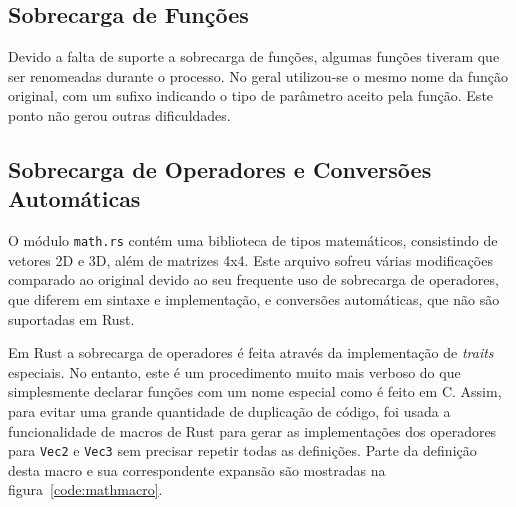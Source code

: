 \documentclass[tg]{mdtufsm}
\def\Cpp{{C\nolinebreak[4]\raisebox{.20ex}{\small\bf++}}}
\begin{document}
\subsection{Sobrecarga de Funções}

Devido a falta de suporte a sobrecarga de funções, algumas funções tiveram que ser renomeadas durante o processo. No geral utilizou-se o mesmo nome da função original, com um sufixo indicando o tipo de parâmetro aceito pela função. Este ponto não gerou outras dificuldades.

\subsection{Sobrecarga de Operadores e Conversões Automáticas}

O módulo \texttt{math.rs} contém uma biblioteca de tipos matemáticos, consistindo de vetores 2D e 3D, além de matrizes 4x4. Este arquivo sofreu várias modificações comparado ao original devido ao seu frequente uso de sobrecarga de operadores, que diferem em sintaxe e implementação, e conversões automáticas, que não são suportadas em Rust.

Em Rust a sobrecarga de operadores é feita através da implementação de \emph{traits} especiais. No entanto, este é um procedimento muito mais verboso do que simplesmente declarar funções com um nome especial como é feito em \Cpp. Assim, para evitar uma grande quantidade de duplicação de código, foi usada a funcionalidade de macros de Rust para gerar as implementações dos operadores para \texttt{Vec2} e \texttt{Vec3} sem precisar repetir todas as definições. Parte da definição desta macro e sua correspondente expansão são mostradas na figura~\ref{code:mathmacro}.
\end{document}
